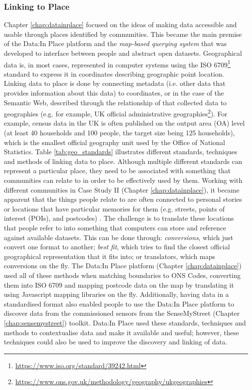 \subsubsection{Linking to Place}
Chapter \ref{chap:datainplace} focused on the ideas of making data accessible and usable through places identified by communities. This became the main premise of the Data:In Place platform and the \textit{map-based querying system} that was developed to interface between people and abstract open datasets. Geographical data is, in most cases, represented in computer systems using the ISO 6709\footnote{\url{https://www.iso.org/standard/39242.html}} standard to express it in coordinates describing geographic point location. Linking data to place is done by connecting metadata (i.e. other data that provides information about this data) to coordinates, or in the case of the Semantic Web, described through the relationship of that collected data to geographies (e.g. for example, UK official administrative geographies\footnote{\url{https://www.ons.gov.uk/methodology/geography/ukgeographies}}). For example, census data in the UK is often published on the output area (OA) level (at least 40 households and 100 people, the target size being 125 households), which is the smallest official geography unit used by the Office of National Statistics. Table \ref{tab:geo_standards} illustrates different standards, techniques and methods of linking data to place. Although multiple different standards can represent a particular place, they need to be associated with something that communities can relate to in order to be effectively used by them. Working with different communities in Case Study II (Chapter \ref{chap:datainplace}), it became apparent that the things people relate to are often connected to personal stories or locations that have particular memories for them (e.g. streets, points of interest (POIs), and postcodes) \citep{manuel_participatory_2017}. The challenge is to translate these locations that people refer to into something that computers can store and reference against available datasets. This can be done through: \textit{conversions}, which just convert one format to another; \textit{best fit}, which tries to find the closest official geographical representation that it fits into; or translators, which maps conversions on the fly. The Data:In Place platform (Chapter \ref{chap:datainplace}) used all of these methods when matching boundaries to ONS Codes, converting them into ISO 6709 and mapping postcode data on the map by translating it using Javascript mapping libraries on the fly. Additionally, having data in a standardised format also enabled people to use the Data:In Place platform to discover data from the commissioned sensors from the SenseMyStreet (Chapter \ref{chap:sensemystreet}) toolkit. Data:In Place used these standards, techniques and methods to contextualise data and make it available and useful; however, these techniques could also be used to improve the discovery and linking of data.

